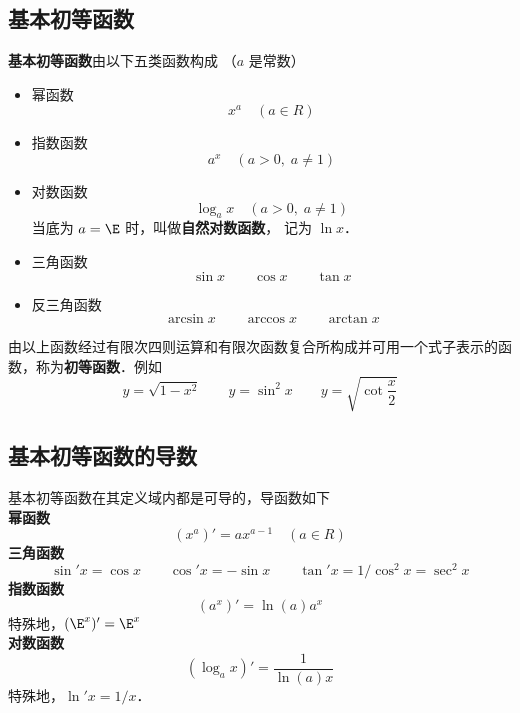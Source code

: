 

\subsection{基本初等函数}
\textbf{基本初等函数}由以下五类函数构成 （$a$ 是常数）

\begin{itemize}
\item 幂函数
\begin{equation}
x^a \quad(a \in R)
\end{equation}
\item 指数函数
\begin{equation}
a^x \quad(a > 0, \; a \ne 1)
\end{equation}
\item 对数函数
\begin{equation}
\log_a x \quad(a > 0, \; a \ne 1)
\end{equation}
当底为 $a = \E$ 时，叫做\textbf{自然对数函数}， 记为 $\ln x$．
\item 三角函数
\begin{equation}
\sin x \qquad  \cos x \qquad \tan x
\end{equation}
\item 反三角函数
\begin{equation}
\arcsin x  \qquad \arccos x  \qquad \arctan x
\end{equation}
\end{itemize}

由以上函数经过有限次四则运算和有限次函数复合所构成并可用一个式子表示的函数，称为\textbf{初等函数}．例如
\begin{equation}
y = \sqrt{1 - x^2}\qquad y = \sin ^2 x\qquad y = \sqrt{\cot \frac{x}{2}} 
\end{equation}



\subsection{基本初等函数的导数}

基本初等函数在其定义域内都是可导的，导函数如下\\
\textbf{幂函数}
\begin{equation}
(x^a)' = a x^{a - 1}  \quad (a \in R)
\end{equation}
\textbf{三角函数}
\begin{equation}
\sin' x = \cos x \qquad \cos' x =  - \sin x \qquad
\tan'x = 1/\cos ^2 x = \sec ^2 x
\end{equation}
\textbf{指数函数}
\begin{equation}
(a^x)' = \ln(a) a^x
\end{equation}
特殊地，$(\E^x)' = \E^x$\\
\textbf{对数函数}
\begin{equation}
(\log_a x)' = \frac{1}{\ln(a)x}
\end{equation}
特殊地，$\ln' x= 1/x$．

